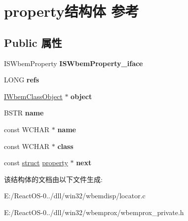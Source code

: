 \hypertarget{structproperty}{}\section{property结构体 参考}
\label{structproperty}
\subsection*{Public 属性}
\begin{DoxyCompactItemize}
\item 
\mbox{\label{structproperty_ac2fd55826c177bd4fcb49cf46b03f234}} 
I\+S\+Wbem\+Property {\bfseries I\+S\+Wbem\+Property\+\_\+iface}
\item 
\mbox{\label{structproperty_a1cdfbcfbcf652b3e411aa060e30e13f1}} 
L\+O\+NG {\bfseries refs}
\item 
\mbox{\label{structproperty_ae1ff509a6994e853398457b2f47c8439}} 
\hyperlink{interface_i_wbem_class_object}{I\+Wbem\+Class\+Object} $\ast$ {\bfseries object}
\item 
\mbox{\label{structproperty_ae143ad4108c46cd5944e644e331aa703}} 
B\+S\+TR {\bfseries name}
\item 
\mbox{\label{structproperty_ae4874c33102c294f76282edda69e30e5}} 
const W\+C\+H\+AR $\ast$ {\bfseries name}
\item 
\mbox{\label{structproperty_adab975d80e58a525850d095d2601517a}} 
const W\+C\+H\+AR $\ast$ {\bfseries class}
\item 
\mbox{\label{structproperty_a1e76e0a041e77c9ef479ebb417bd3dfc}} 
const \hyperlink{interfacestruct}{struct} \hyperlink{structproperty}{property} $\ast$ {\bfseries next}
\end{DoxyCompactItemize}


该结构体的文档由以下文件生成\+:\begin{DoxyCompactItemize}
\item 
E\+:/\+React\+O\+S-\/0../dll/win32/wbemdisp/locator.\+c\item 
E\+:/\+React\+O\+S-\/0../dll/win32/wbemprox/wbemprox\+\_\+private.\+h\end{DoxyCompactItemize}
